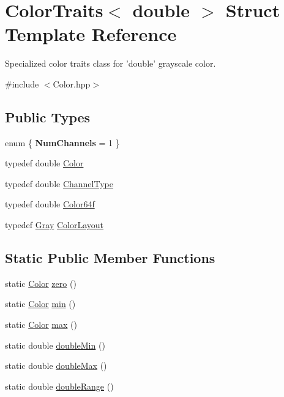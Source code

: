\hypertarget{struct_d_o_1_1_color_traits_3_01double_01_4}{\section{Color\-Traits$<$ double $>$ Struct Template Reference}
\label{struct_d_o_1_1_color_traits_3_01double_01_4}
}


Specialized color traits class for 'double' grayscale color.  




{\ttfamily \#include $<$Color.\-hpp$>$}

\subsection*{Public Types}
\begin{DoxyCompactItemize}
\item 
enum \{ {\bfseries Num\-Channels} = 1
 \}
\item 
typedef double \hyperlink{struct_d_o_1_1_color_traits_3_01double_01_4_a8b96d8e5cd628393636da37219eb5a2d}{Color}
\item 
typedef double \hyperlink{struct_d_o_1_1_color_traits_3_01double_01_4_ae21d84313286d731e69913a7fd7a538e}{Channel\-Type}
\item 
typedef double \hyperlink{struct_d_o_1_1_color_traits_3_01double_01_4_a9a301fd8ba0a7225e38351d3e5b2e4d3}{Color64f}
\item 
typedef \hyperlink{struct_d_o_1_1_gray}{Gray} \hyperlink{struct_d_o_1_1_color_traits_3_01double_01_4_a7c9d599cfa0d1404784fbe60e6bcfd24}{Color\-Layout}
\end{DoxyCompactItemize}
\subsection*{Static Public Member Functions}
\begin{DoxyCompactItemize}
\item 
static \hyperlink{struct_d_o_1_1_color_traits_3_01double_01_4_a8b96d8e5cd628393636da37219eb5a2d}{Color} \hyperlink{struct_d_o_1_1_color_traits_3_01double_01_4_a57b00f8db42515f404e06ab933932125}{zero} ()
\item 
static \hyperlink{struct_d_o_1_1_color_traits_3_01double_01_4_a8b96d8e5cd628393636da37219eb5a2d}{Color} \hyperlink{struct_d_o_1_1_color_traits_3_01double_01_4_a1cd81f912af766f8004e4d5a82a7128b}{min} ()
\item 
static \hyperlink{struct_d_o_1_1_color_traits_3_01double_01_4_a8b96d8e5cd628393636da37219eb5a2d}{Color} \hyperlink{struct_d_o_1_1_color_traits_3_01double_01_4_aded391d5e231096e135e08760c0fbeb6}{max} ()
\item 
static double \hyperlink{struct_d_o_1_1_color_traits_3_01double_01_4_aa122aba748bfd453a27d2c30b368dbc3}{double\-Min} ()
\item 
static double \hyperlink{struct_d_o_1_1_color_traits_3_01double_01_4_ab9fb6b1bb12e23b725453a69f6193c30}{double\-Max} ()
\item 
static double \hyperlink{struct_d_o_1_1_color_traits_3_01double_01_4_aed64f95e634b8dac0ae5a0aed2b45740}{double\-Range} ()
\end{DoxyCompactItemize}


